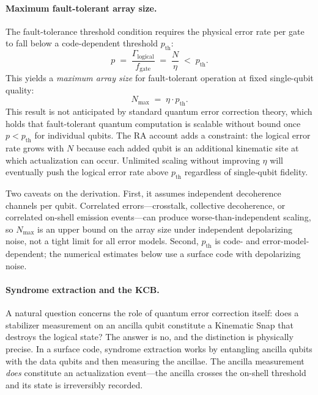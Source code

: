 \documentclass[11pt,a4paper]{article}
\theoremstyle{plain}
\theoremstyle{definition}
\theoremstyle{remark}
\begin{document}
\paragraph{Maximum fault-tolerant array size.}
The fault-tolerance threshold condition requires the physical error rate per gate
to fall below a code-dependent threshold $p_{\mathrm{th}}$:
\begin{equation}
  p \;=\; \frac{\Gamma_{\mathrm{logical}}}{f_{\mathrm{gate}}}
    \;=\; \frac{N}{\eta} \;<\; p_{\mathrm{th}}.
  \label{eq:pth}
\end{equation}
This yields a \emph{maximum array size} for fault-tolerant operation at fixed
single-qubit quality:
\begin{equation}
  \boxed{N_{\max} \;=\; \eta \cdot p_{\mathrm{th}}.}
  \label{eq:nmax}
\end{equation}
This result is not anticipated by standard quantum error correction theory, which
holds that fault-tolerant quantum computation is scalable without bound once
$p < p_{\mathrm{th}}$ for individual qubits. The RA account adds a constraint:
the logical error rate grows with $N$ because each added qubit is an additional
kinematic site at which actualization can occur. Unlimited scaling without
improving $\eta$ will eventually push the logical error rate above
$p_{\mathrm{th}}$ regardless of single-qubit fidelity.

Two caveats on the derivation. First, it assumes independent decoherence channels
per qubit. Correlated errors---crosstalk, collective decoherence, or correlated
on-shell emission events---can produce worse-than-independent scaling, so $N_{{\max}}$
is an upper bound on the array size under independent depolarizing noise, not a
tight limit for all error models. Second, $p_{{\mathrm{th}}}$ is code- and
error-model-dependent; the numerical estimates below use a surface code with
depolarizing noise.

\paragraph{Syndrome extraction and the KCB.}
A natural question concerns the role of quantum error correction itself: does a
stabilizer measurement on an ancilla qubit constitute a Kinematic Snap that
destroys the logical state? The answer is no, and the distinction is physically
precise. In a surface code, syndrome extraction works by entangling ancilla qubits
with the data qubits and then measuring the ancillae. The ancilla measurement
\emph{does} constitute an actualization event---the ancilla crosses the on-shell
threshold and its state is irreversibly recorded.
\end{document}
